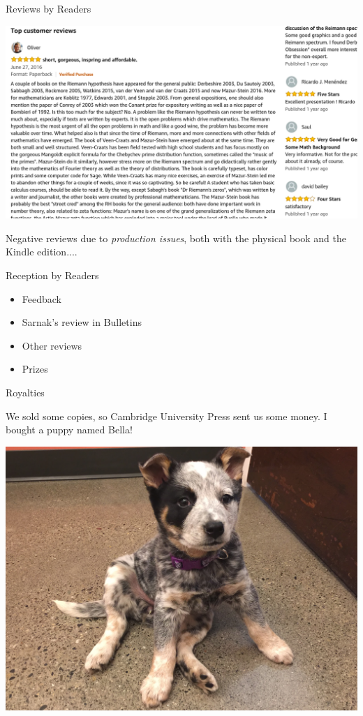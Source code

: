\documentclass{beamer}
\begin{document}
\begin{frame}{Reviews by Readers}

  \includegraphics[width=.98\textwidth]{pics/amazon-review.png}

  \vfill

  Negative reviews  due to \textit{production issues}, both with the physical book
  and the Kindle edition....

\end{frame}

\begin{frame}{Reception by Readers}
  \begin{itemize}
    \item Feedback
    \item Sarnak's review in Bulletins
    \item Other reviews
    \item Prizes
  \end{itemize}
\end{frame}

\begin{frame}{Royalties}

  We sold some copies, so Cambridge University Press sent us some money.
  I bought a puppy named Bella!

  \begin{center}
    \includegraphics[height=.7\textheight]{pics/bella-puppy.png}
  \end{center}


\end{frame}
\end{document}
